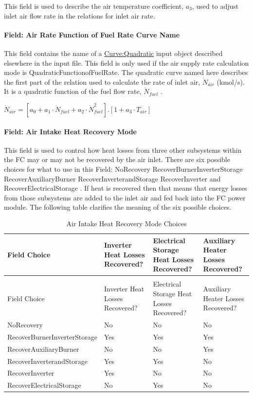 This field is used to describe the air temperature coefficient, \({a_3}\), used to adjust inlet air flow rate in the relations for inlet air rate.

\paragraph{Field: Air Rate Function of Fuel Rate Curve Name}\label{field-air-rate-function-of-fuel-rate-curve-name}

This field contains the name of a \hyperref[curvequadratic]{Curve:Quadratic} input object described elsewhere in the input file. This field is only used if the air supply rate calculation mode is QuadraticFunctionofFuelRate. The quadratic curve named here describes the first part of the relation used to calculate the rate of inlet air, \({\dot N_{air}}\) (kmol/s). It is a quadratic function of the fuel flow rate, \({\dot N_{fuel}}\) .

 \({\dot N_{air}} = \left[ {{a_0} + {a_1} \cdot {{\dot N}_{fuel}} + {a_2} \cdot \dot N_{fuel}^2} \right].\left[ {1 + {a_3} \cdot {T_{air}}} \right]\)

\paragraph{Field: Air Intake Heat Recovery Mode}\label{field-air-intake-heat-recovery-mode}

This field is used to control how heat losses from three other subsystems within the FC may or may not be recovered by the air inlet. There are six possible choices for what to use in this Field: NoRecovery RecoverBurnerInverterStorage RecoverAuxiliaryBurner RecoverInverterandStorage RecoverInverter and RecoverElectricalStorage . If heat is recovered then that means that energy losses from those subsystems are added to the inlet air and fed back into the FC power module. The following table clarifies the meaning of the six possible choices.

\begin{longtable}[c]{p{1.5in}p{1.5in}p{1.5in}p{1.5in}}
\caption{Air Intake Heat Recovery Mode Choices \label{table:air-intake-heat-recovery-mode-choices}} \tabularnewline
\toprule
Field Choice & Inverter Heat Losses Recovered? & Electrical Storage Heat Losses Recovered? & Auxiliary Heater Losses Recovered? \tabularnewline
\midrule
\endfirsthead

\caption[]{Air Intake Heat Recovery Mode Choices} \tabularnewline
\toprule
Field Choice & Inverter Heat Losses Recovered? & Electrical Storage Heat Losses Recovered? & Auxiliary Heater Losses Recovered? \tabularnewline
\midrule
\endhead

NoRecovery & No & No & No \tabularnewline
RecoverBurnerInverterStorage & Yes & Yes & Yes \tabularnewline
RecoverAuxiliaryBurner & No & No & Yes \tabularnewline
RecoverInverterandStorage & Yes & Yes & No \tabularnewline
RecoverInverter & Yes & No & No \tabularnewline
RecoverElectricalStorage & No & Yes & No \tabularnewline
\bottomrule
\end{longtable}

